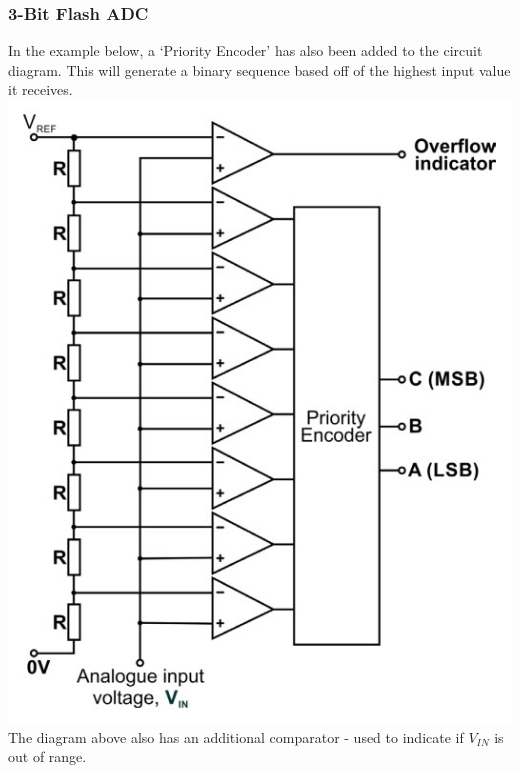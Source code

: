 \documentclass[a4paper,11pt, twocolumn]{article}
\begin{document}
\subsubsection{3-Bit Flash ADC}
In the example below, a `Priority Encoder' has also been added to the circuit diagram. This will generate a binary sequence based off of the highest input value it receives.
\includegraphics[width=\linewidth]{3bitFlash.jpg}
The diagram above also has an additional comparator - used to indicate if $V_{IN}$ is out of range.
\end{document}
